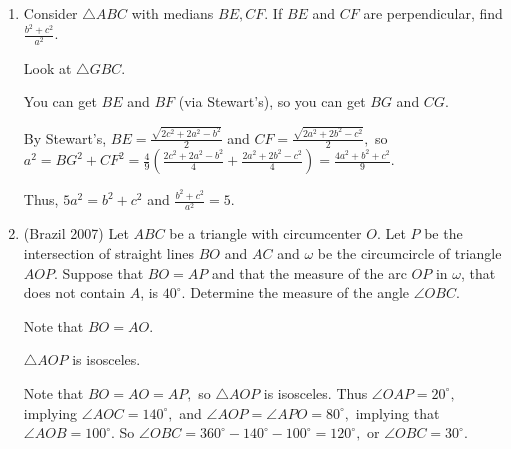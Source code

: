 \begin{enumerate}
    \item Consider $\triangle ABC$ with medians $BE,CF.$ If $BE$ and $CF$ are perpendicular, find $\frac{b^2+c^2}{a^2}.$\begin{hint}
    \begin{addhint}
    {Look at $\triangle GBC.$}
    \end{addhint}
    \begin{addhint}
    {You can get $BE$ and $BF$ (via Stewart's), so you can get $BG$ and $CG.$}
    \end{addhint}
    \end{hint}
    \begin{solu}
    \begin{addsol}
    {By Stewart's, $BE=\frac{\sqrt{2c^2+2a^2-b^2}}{2}$ and $CF=\frac{\sqrt{2a^2+2b^2-c^2}}{2},$ so $a^2=BG^2+CF^2=\frac{4}{9}(\frac{2c^2+2a^2-b^2}{4}+\frac{2a^2+2b^2-c^2}{4})=\frac{4a^2+b^2+c^2}{9}.$
    
    Thus, $5a^2=b^2+c^2$ and $\frac{b^2+c^2}{a^2}=5.$}
    \end{addsol}
    \end{solu}
    
    \item (Brazil 2007) Let $ABC$ be a triangle with circumcenter $O$. Let $P$ be the intersection of straight lines $BO$ and $AC$ and $\omega$ be the circumcircle of triangle $AOP$. Suppose that $BO = AP$ and that the measure of the arc $OP$ in $\omega$, that does not contain $A$, is $40^{\circ}$. Determine the measure of the angle $\angle OBC$.
    \begin{hint}
    \begin{addhint}
    {Note that $BO=AO.$}
    \end{addhint}
    \begin{addhint}
    {$\triangle AOP$ is isosceles.}
    \end{addhint}
    \end{hint}
    \begin{solu}
    \begin{addsol}
    {Note that $BO=AO=AP,$ so $\triangle AOP$ is isosceles. Thus $\angle OAP=20^{\circ},$ implying $\angle AOC=140^{\circ},$ and $\angle AOP=\angle APO=80^{\circ},$ implying that $\angle AOB=100^{\circ}.$ So $\angle OBC=360^{\circ}-140^{\circ}-100^{\circ}=120^{\circ},$ or $\angle OBC=30^{\circ}.$
    
    \begin{center}
\end{center}}
\end{addsol}
\end{solu}
\end{enumerate}

